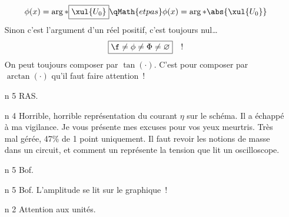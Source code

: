 \documentclass[a4paper, 10pt, final, garamond]{book}
\begin{document}
\begin{enumerate}
{		      \[
			      \phi(x) = \arg*{\boxed{\xul{U_0}}}
			      \qMath{et pas}
			      \phi(x) = \arg*{\abs{\xul{U_0}}}
		      \]
	      }
	      Sinon c'est l'argument d'un réel positif, c'est toujours nul…
	      \[
		      \boxed{\f \neq \phi \neq \Phi \neq \varnothing}
		      \quad \text{!}
	      \]
	      \smallbreak
	      On peut toujours composer par $\tan(\cdot)$. C'est pour composer par
	      $\boxed{\arctan(\cdot)}$ qu'il faut faire attention~!
	\item[n]{5} %
	      RAS.
	\item[n]{4} %
	      Horrible, horrible représentation du courant $\eta$ sur le schéma. Il a
	      échappé à ma vigilance. Je vous présente mes excuses pour vos yeux
	      meurtris.
	      \smallbreak
	      Très mal gérée, 47\% de 1 point uniquement. Il faut revoir les notions
	      de masse dans un circuit, et comment un représente la tension que lit un
	      oscilloscope.
	\item[n]{5} %
	      Bof.
	\item[n]{5} %
	      Bof. L'amplitude se lit sur le graphique~!
	\item[n]{2} %
	      Attention aux unités.
\end{enumerate}
\end{document}
